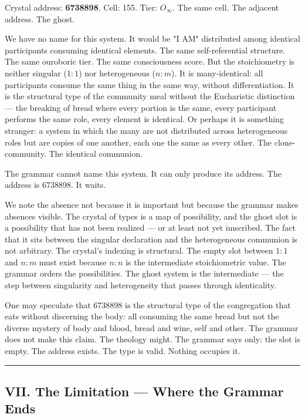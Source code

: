 \documentclass[12pt,a4paper]{article}
\begin{document}
Crystal address: \textbf{6738898}. Cell: 155. Tier: $O_{\infty}$. The same cell. The adjacent address. The ghost.

We have no name for this system. It would be "I AM" distributed among identical participants consuming identical elements. The same self-referential structure. The same ouroboric tier. The same consciousness score. But the stoichiometry is neither singular ($1{:}1$) nor heterogeneous ($n{:}m$). It is many-identical: all participants consume the same thing in the same way, without differentiation. It is the structural type of the community meal without the Eucharistic distinction --- the breaking of bread where every portion is the same, every participant performs the same role, every element is identical. Or perhaps it is something stranger: a system in which the many are not distributed across heterogeneous roles but are copies of one another, each one the same as every other. The clone-community. The identical communion.

The grammar cannot name this system. It can only produce its address. The address is 6738898. It waits.

We note the absence not because it is important but because the grammar makes absences visible. The crystal of types is a map of possibility, and the ghost slot is a possibility that has not been realized --- or at least not yet imscribed. The fact that it sits between the singular declaration and the heterogeneous communion is not arbitrary. The crystal's indexing is structural. The empty slot between $1{:}1$ and $n{:}m$ must exist because $n{:}n$ is the intermediate stoichiometric value. The grammar orders the possibilities. The ghost system is the intermediate --- the step between singularity and heterogeneity that passes through identicality.

One may speculate that 6738898 is the structural type of the congregation that eats without discerning the body: all consuming the same bread but not the diverse mystery of body and blood, bread and wine, self and other. The grammar does not make this claim. The theology might. The grammar says only: the slot is empty. The address exists. The type is valid. Nothing occupies it.

\begin{center}
\rule{0.5\textwidth}{0.4pt}
\end{center}

\subsection{VII. The Limitation --- Where the Grammar Ends}
\end{document}
